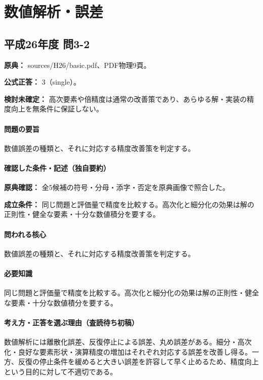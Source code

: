 \section{数値解析・誤差}

\subsection{平成26年度 問3-2}
\label{q:h26-reg-basic-3-2}

\noindent\textbf{原典：} sources/H26/basic.pdf、PDF物理9頁。

\textbf{公式正答：} 3（single）。

\par\textbf{検討未確定：} 高次要素や倍精度は通常の改善策であり、あらゆる解・実装の精度向上を無条件に保証しない。

\paragraph{問題の要旨} 数値誤差の種類と、それに対応する精度改善策を判定する。

\paragraph{確認した条件・記述（独自要約）}\mbox{}\par

\noindent\textbf{原典確認：} 全5候補の符号・分母・添字・否定を原典画像で照合した。\par

\noindent\textbf{成立条件：} 同じ問題と評価量で精度を比較する。高次化と細分化の効果は解の正則性・健全な要素・十分な数値積分を要する。\par

\paragraph{問われる核心} 数値誤差の種類と、それに対応する精度改善策を判定する。

\paragraph{必要知識} 同じ問題と評価量で精度を比較する。高次化と細分化の効果は解の正則性・健全な要素・十分な数値積分を要する。

\paragraph{考え方・正答を選ぶ理由（査読待ち初稿）} 数値解析には離散化誤差、反復停止による誤差、丸め誤差がある。細分・高次化・良好な要素形状・演算精度の増加はそれぞれ対応する誤差を改善し得る。一方、反復の停止条件を緩めると大きい誤差を許容して早く止めるため、精度向上という目的に対して不適切である。

